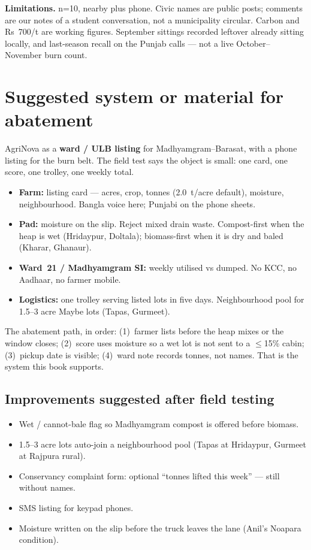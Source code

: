\documentclass[12pt,a4paper]{article}
\begin{document}
\textbf{Limitations.} n=10, nearby plus phone. Civic names are public posts; comments are our notes of a student conversation, not a municipality circular. Carbon and Rs~700/t are working figures. September sittings recorded leftover already sitting locally, and last-season recall on the Punjab calls --- not a live October--November burn count.

\section{Suggested system or material for abatement}
AgriNova as a \textbf{ward / ULB listing} for Madhyamgram--Barasat, with a phone listing for the burn belt. The field test says the object is small: one card, one score, one trolley, one weekly total.

\begin{itemize}
  \item \textbf{Farm:} listing card --- acres, crop, tonnes (2.0~t/acre default), moisture, neighbourhood. Bangla voice here; Punjabi on the phone sheets.
  \item \textbf{Pad:} moisture on the slip. Reject mixed drain waste. Compost-first when the heap is wet (Hridaypur, Doltala); biomass-first when it is dry and baled (Kharar, Ghanaur).
  \item \textbf{Ward~21 / Madhyamgram SI:} weekly utilised vs dumped. No KCC, no Aadhaar, no farmer mobile.
  \item \textbf{Logistics:} one trolley serving listed lots in five days. Neighbourhood pool for 1.5--3 acre Maybe lots (Tapas, Gurmeet).
\end{itemize}

The abatement path, in order: (1)~farmer lists before the heap mixes or the window closes; (2)~score uses moisture so a wet lot is not sent to a $\le$15\% cabin; (3)~pickup date is visible; (4)~ward note records tonnes, not names. That is the system this book supports.

\subsection{Improvements suggested after field testing}
\begin{itemize}
  \item Wet / cannot-bale flag so Madhyamgram compost is offered before biomass.
  \item 1.5--3 acre lots auto-join a neighbourhood pool (Tapas at Hridaypur, Gurmeet at Rajpura rural).
  \item Conservancy complaint form: optional ``tonnes lifted this week'' --- still without names.
  \item SMS listing for keypad phones.
  \item Moisture written on the slip before the truck leaves the lane (Anil's Noapara condition).
\end{itemize}
\end{document}

